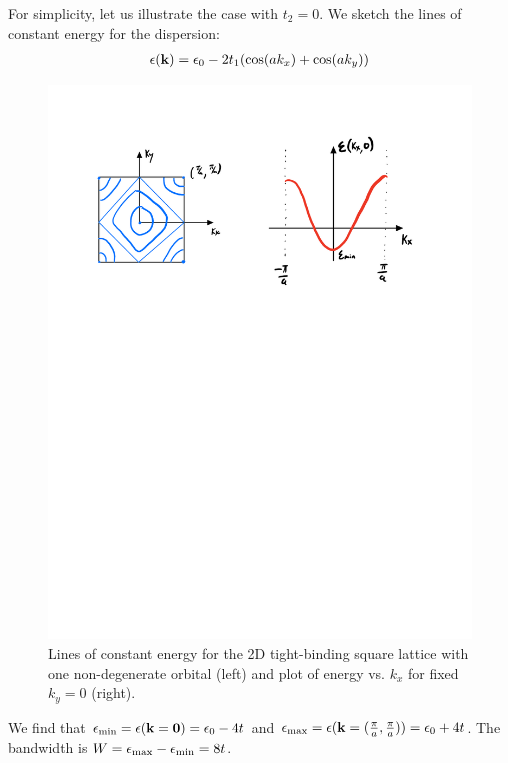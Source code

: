 For simplicity, let us illustrate the case with $t_2 = 0$. We sketch the lines of constant energy for the dispersion:
\begin{align*}
    \epsilon(\mathbf{k}) = \epsilon_0 - 2t_1(\cos(ak_x) + \cos(ak_y))
\end{align*}

\begin{figure}[htbp]
    \centering
    \includegraphics[scale=0.7]{Images/fig-2dtightbindingsquarelatticedispersion.pdf}
    
    \caption{Lines of constant energy for the 2D tight-binding square lattice with one non-degenerate orbital (left) and plot of energy vs. $k_x$ for fixed $k_y = 0$ (right).}
    \label{fig-2dtightbindingsquarelatticedispersion}
\end{figure}

We find that $\epsilon_{\text{min}} = \epsilon(\mathbf{k} = \mathbf{0}) = \epsilon_0 - 4t$ and $\epsilon_{\text{max}} = \epsilon(\mathbf{k} = (\frac{\pi}{a}, \frac{\pi}{a})) = \epsilon_0 + 4t$. The bandwidth is $W = \epsilon_{\text{max}} - \epsilon_{\text{min}} = 8t$. 

